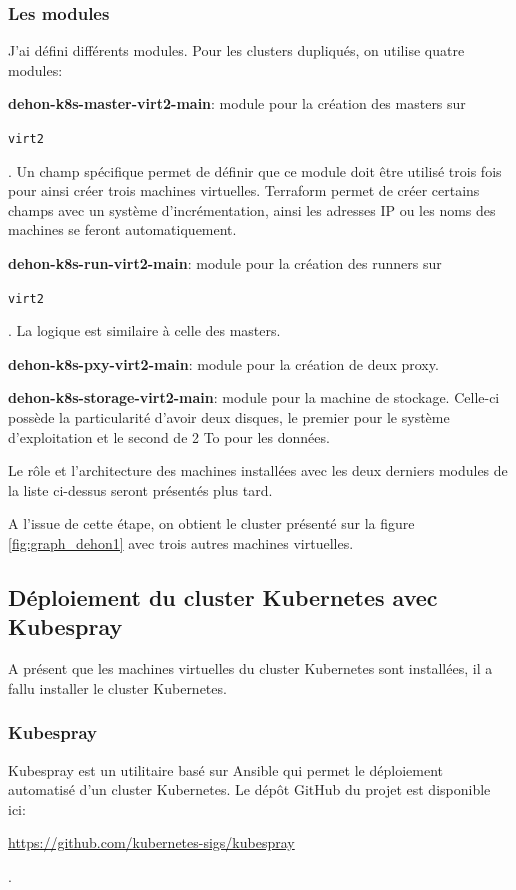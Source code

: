 \documentclass[12pt, a4paper, twoside]{article}
\begin{document}
\subsubsection{Les modules}
J'ai défini différents modules. Pour les \gls{cluster}s dupliqués, on utilise quatre modules:

\textbf{dehon-k8s-master-virt2-main}: module pour la création des masters sur \begin{code}\texttt{virt2}\end{code}.
Un champ spécifique permet de définir que ce module doit être utilisé trois fois pour ainsi créer trois machines virtuelles.
Terraform permet de créer certains champs avec un système d'incrémentation, ainsi les adresses \gls{IP} ou les noms des machines se feront automatiquement.

\textbf{dehon-k8s-run-virt2-main}: module pour la création des runners sur \begin{code}\texttt{virt2}\end{code}. 
La logique est similaire à celle des masters.

\textbf{dehon-k8s-pxy-virt2-main}: module pour la création de deux proxy.

\textbf{dehon-k8s-storage-virt2-main}: module pour la machine de stockage.
Celle-ci possède la particularité d'avoir deux disques, le premier pour le système d'exploitation et le second de 2 To pour les données.

Le rôle et l'architecture des machines installées avec les deux derniers modules de la liste ci-dessus seront présentés plus tard.

A l'issue de cette étape, on obtient le \gls{cluster} présenté sur la figure \ref{fig:graph_dehon1} avec trois autres machines virtuelles.

\subsection{Déploiement du cluster Kubernetes avec Kubespray}
A présent que les machines virtuelles du \gls{cluster} \gls{Kubernetes} sont installées, il a fallu installer le \gls{cluster} \gls{Kubernetes}.

\subsubsection{Kubespray}
\gls{Kubespray} est un utilitaire basé sur \gls{Ansible} qui permet le déploiement automatisé d'un \gls{cluster} \gls{Kubernetes}.
Le dépôt GitHub du projet est disponible ici: \\ \begin{hilite}\url{https://github.com/kubernetes-sigs/kubespray}\end{hilite}.
\end{document}
